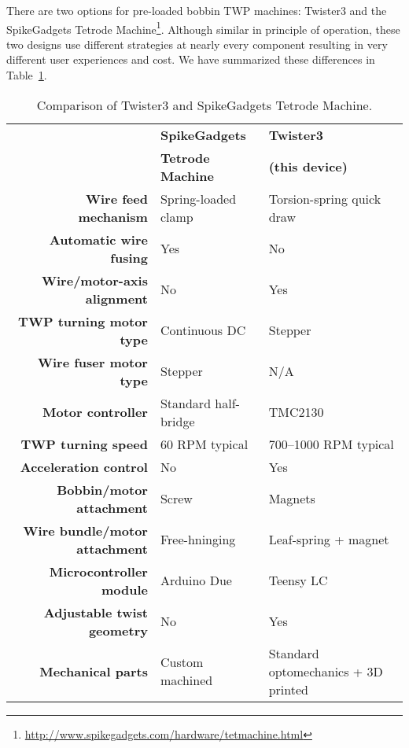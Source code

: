 \documentclass[11pt,a4paper]{article}
\begin{document}
There are two options for pre-loaded bobbin TWP machines: Twister3 and the
SpikeGadgets Tetrode
Machine\footnote{\url{http://www.spikegadgets.com/hardware/tetmachine.html}}.
Although similar in principle of operation, these two designs use different
strategies at nearly every component resulting in very different user
experiences and cost. We have summarized these differences in
Table~\ref{t:compare}.

\setlength{\tabcolsep}{10pt}

\begin{table}[!htbp]
\centering
\caption{Comparison of Twister3 and SpikeGadgets Tetrode Machine.}
\label{t:compare}

\begin{tabular}{rll}
\toprule
&
\textbf{SpikeGadgets} &
\textbf{Twister3} \\
&
\textbf{Tetrode Machine} &
\textbf{(this device)} \\

\cmidrule{2-3}

\textbf{Wire feed mechanism}            & Spring-loaded clamp   & Torsion-spring quick draw  \\
\textbf{Automatic wire fusing}          & Yes                   & No \\
\textbf{Wire/motor-axis alignment}      & No                    & Yes \\
\textbf{TWP turning motor type}         & Continuous DC         & Stepper \\
\textbf{Wire fuser motor type}          & Stepper               & N/A \\
\textbf{Motor controller}               & Standard half-bridge  & TMC2130 \\
\textbf{TWP turning speed}              & 60 RPM typical        & 700--1000 RPM typical \\
\textbf{Acceleration control}           & No                    & Yes \\
\textbf{Bobbin/motor attachment}        & Screw                 & Magnets \\
\textbf{Wire bundle/motor attachment}   & Free-hninging         & Leaf-spring + magnet \\
\textbf{Microcontroller module}         & Arduino Due           & Teensy LC \\
\textbf{Adjustable twist geometry }     & No                    & Yes \\
\textbf{Mechanical parts}               & Custom machined       & Standard optomechanics + 3D printed \\
\bottomrule
\end{tabular}
\end{table}
\end{document}
